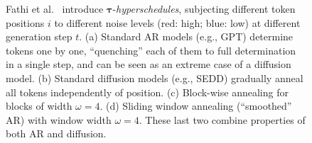 \begin{figure}[h]
    \centering
    \hfill
    \hfill
    \hfill
    \caption[短标题用于目录]{%
        Fathi et al.~\cite{fathi_unifying_2025} introduce $\boldsymbol{\tau}$-\emph{hyperschedules}, subjecting different token positions $i$ to different noise levels (red: high; blue: low) at different generation step $t$. 
        (a) Standard AR models (e.g., GPT) determine tokens one by one, ``quenching'' each of them to full determination in a single step, and can be seen as an extreme case of a diffusion model. 
        (b) Standard diffusion models (e.g., SEDD) gradually anneal all tokens independently of position. 
        (c) Block-wise annealing for blocks of width $\omega=4$. 
        (d) Sliding window annealing (``smoothed'' AR) with window width $\omega=4$. These last two combine properties of both AR and diffusion.%
    }
    \label{fig:four_subfigs}
\end{figure}

